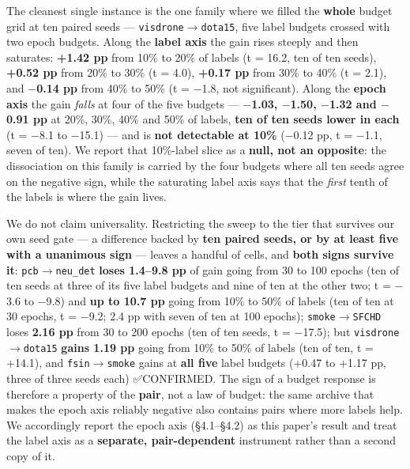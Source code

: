 \documentclass[pdflatex,sn-mathphys-ay]{sn-jnl}
\begin{document}
The cleanest single instance is the one family where we filled the \textbf{whole} budget grid at ten paired seeds --- \texttt{visdrone\ensuremath{\rightarrow}dota15}, five label budgets crossed with two epoch budgets. Along the \textbf{label axis} the gain rises steeply and then saturates: \textbf{+1.42 pp} from 10\% to 20\% of labels (t = 16.2, ten of ten seeds), \textbf{+0.52 pp} from 20\% to 30\% (t = 4.0), \textbf{+0.17 pp} from 30\% to 40\% (t = 2.1), and \textbf{\ensuremath{-}0.14 pp} from 40\% to 50\% (t = \ensuremath{-}1.8, not significant). Along the \textbf{epoch axis} the gain \emph{falls} at four of the five budgets --- \textbf{\ensuremath{-}1.03, \ensuremath{-}1.50, \ensuremath{-}1.32 and \ensuremath{-}0.91 pp} at 20\%, 30\%, 40\% and 50\% of labels, \textbf{ten of ten seeds lower in each} (t = \ensuremath{-}8.1 to \ensuremath{-}15.1) --- and is \textbf{not detectable at 10\%} (\ensuremath{-}0.12 pp, t = \ensuremath{-}1.1, seven of ten). We report that 10\%-label slice as a \textbf{null, not an opposite}: the dissociation on this family is carried by the four budgets where all ten seeds agree on the negative sign, while the saturating label axis says that the \emph{first} tenth of the labels is where the gain lives.

We do not claim universality. Restricting the sweep to the tier that survives our own seed gate --- a difference backed by \textbf{ten paired seeds, or by at least five with a unanimous sign} --- leaves a handful of cells, and \textbf{both signs survive it}: \texttt{pcb\ensuremath{\rightarrow}neu\_det} \textbf{loses 1.4--9.8 pp} of gain going from 30 to 100 epochs (ten of ten seeds at three of its five label budgets and nine of ten at the other two; t = \ensuremath{-}3.6 to \ensuremath{-}9.8) and \textbf{up to 10.7 pp} going from 10\% to 50\% of labels (ten of ten at 30 epochs, t = \ensuremath{-}9.2; 2.4 pp with seven of ten at 100 epochs); \texttt{smoke\ensuremath{\rightarrow}SFCHD} loses \textbf{2.16 pp} from 30 to 200 epochs (ten of ten seeds, t = \ensuremath{-}17.5); but \texttt{visdrone\ensuremath{\rightarrow}dota15} \textbf{gains 1.19 pp} going from 10\% to 50\% of labels (ten of ten, t = +14.1), and \texttt{fsin\ensuremath{\rightarrow}smoke} gains at \textbf{all five} label budgets (+0.47 to +1.17 pp, three of three seeds each) ✅CONFIRMED. The sign of a budget response is therefore a property of the \textbf{pair}, not a law of budget: the same archive that makes the epoch axis reliably negative also contains pairs where more labels help. We accordingly report the epoch axis (\S{}4.1--\S{}4.2) as this paper's result and treat the label axis as a \textbf{separate, pair-dependent} instrument rather than a second copy of it.
\end{document}
